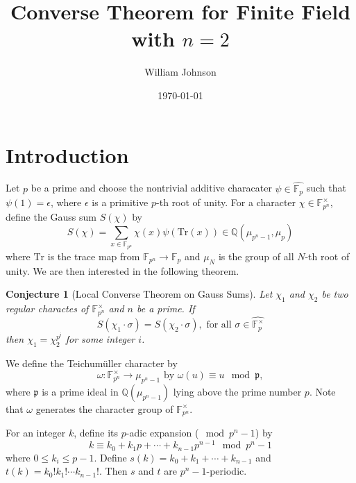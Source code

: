 \documentclass[12pt]{article}
\theoremstyle{customtheorem}%
\newtheorem{conj}{Conjecture}
\theoremstyle{remark}
\theoremstyle{definition}
\numberwithin{equation}{section}
\numberwithin{theorem}{section}
\newcommand{\F}{\mathbb{F}}
\newcommand{\Q}{\mathbb{Q}}
\newcommand{\tr}{\textrm{Tr}}
\begin{document}


\title{Converse Theorem for Finite Field with $n=2$}
\author{William Johnson}
\date{\today}


\maketitle
\thispagestyle{empty}



\section{Introduction} \label{sect:1}

Let $p$ be a prime and choose the nontrivial additive characater $\psi \in \hat{\F_p}$ such that $\psi(1) = \epsilon$, where $\epsilon$ is a primitive $p$-th root of unity. 
For a character $\chi \in \F_{p^n}^\times$, define the Gauss sum $S(\chi)$ by \[S(\chi) = \sum_{x \in \F_{p^n}} \chi(x) \psi(\tr(x)) \in \Q(\mu_{p^n-1}, \mu_p)\] where $\tr$ is the trace map from $\F_{p^n} \to \F_{p}$ and $\mu_N$ is the group of all $N$-th root of unity.
We are then interested in the following theorem.

\begin{conj}[Local Converse Theorem on Gauss Sums]
Let $\chi_1$ and $\chi_2$ be two regular charactes of $\F_{p^n}^\times$ and $n$ be a prime. If \[S(\chi_1 \cdot \sigma) = S(\chi_2 \cdot \sigma), \text{ for all } \sigma \in \hat{\F_p^\times}\] then $\chi_1 = \chi_2^{p^i}$ for some integer $i$.
\end{conj}

We define the Teichum\"uller character by \[ \omega : \F_{p^n}^\times \to \mu_{p^n-1} \text{ by } \omega(u) \equiv u \mod \mathfrak{p},\] where $\mathfrak{p}$ is a prime ideal in $\Q(\mu_{p^n-1})$ lying above the prime number $p$.
Note that $\omega$ generates the character group of $\F_{p^n}^\times$.

For an integer $k$, define its $p$-adic expansion ($\mod p^n -1$) by \[k \equiv k_0 + k_1 p + \cdots + k_{n-1}p^{n-1} \mod p^n - 1\] where $0 \leq k_i \leq p -1$. 
Define $s(k) = k_0 + k_1 + \cdots + k_{n-1}$ and $t(k) = k_0! k_1! \cdots k_{n-1}!$.
Then $s$ and $t$ are $p^n - 1$-periodic.
\end{document}
